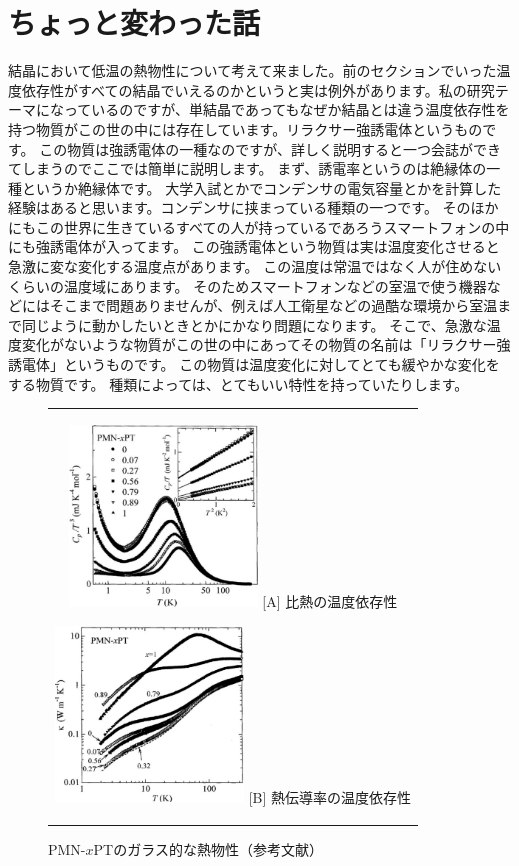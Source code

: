 \documentclass[10pt,b5paper,papersize,dvipdfmx]{jsbook}
\begin{document}
\section{ちょっと変わった話}
結晶において低温の熱物性について考えて来ました。前のセクションでいった温度依存性がすべての結晶でいえるのかというと実は例外があります。私の研究テーマになっているのですが、単結晶であってもなぜか結晶とは違う温度依存性を持つ物質がこの世の中には存在しています。リラクサー強誘電体というものです。
この物質は強誘電体の一種なのですが、詳しく説明すると一つ会誌ができてしまうのでここでは簡単に説明します。
まず、誘電率というのは絶縁体の一種というか絶縁体です。
大学入試とかでコンデンサの電気容量とかを計算した経験はあると思います。コンデンサに挟まっている種類の一つです。
そのほかにもこの世界に生きているすべての人が持っているであろうスマートフォンの中にも強誘電体が入ってます。
この強誘電体という物質は実は温度変化させると急激に変な変化する温度点があります。
この温度は常温ではなく人が住めないくらいの温度域にあります。
そのためスマートフォンなどの室温で使う機器などにはそこまで問題ありませんが、例えば人工衛星などの過酷な環境から室温まで同じように動かしたいときとかにかなり問題になります。
そこで、急激な温度変化がないような物質がこの世の中にあってその物質の名前は「リラクサー強誘電体」というものです。
この物質は温度変化に対してとても緩やかな変化をする物質です。
種類によっては、とてもいい特性を持っていたりします。
\begin{figure}[htbp]
  \centering
  \begin{tabular}{c}
    \begin{minipage}{0.5\hsize}
      \centering
      \includegraphics[clip, width=5cm]{img/relaxor-heat-capacity.pdf}
      \hspace{1.6cm} [A] 比熱の温度依存性
    \end{minipage}
    \begin{minipage}{0.5\hsize}
      \centering
      \includegraphics[clip, width=5cm]{img/relaxor-thermal-conductivity.pdf}
      \hspace{1.6cm} [B] 熱伝導率の温度依存性
    \end{minipage}
  \end{tabular}
  \caption{PMN-$x$PTのガラス的な熱物性（参考文献\cite{relaxCT}）}
  \label{fig:lena}
\end{figure}
\end{document}
